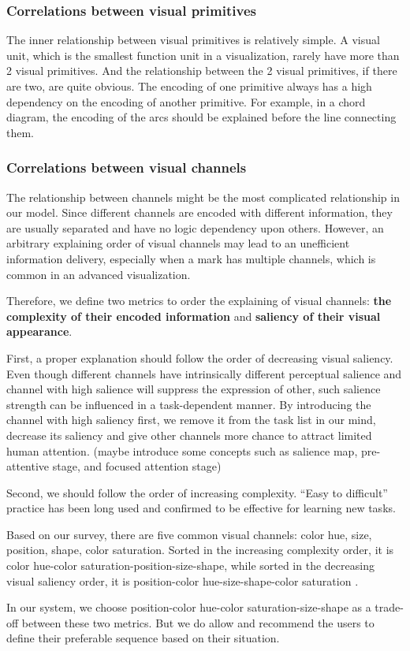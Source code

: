 \documentclass[review,journal]{vgtc}         %
\begin{document}
\subsubsection{Correlations between visual primitives}
The inner relationship between visual primitives is relatively simple.
A visual unit, which is the smallest function unit in a visualization, rarely have more than 2 visual primitives. And the relationship between the 2 visual primitives, if there are two, are quite obvious. The encoding of one primitive always has a high dependency on the encoding of another primitive. For example, in a chord diagram, the encoding of the arcs should be explained before the line connecting them. 

\subsubsection{Correlations between visual channels}
The relationship between channels might be the most complicated relationship in our model. Since different channels are encoded with different information, they are usually separated and have no logic dependency upon others. However, an arbitrary explaining order of visual channels may lead to an unefficient information delivery, especially when a mark has multiple channels, which is common in an advanced visualization. 

Therefore, we define two metrics to order the explaining of visual channels: \textbf{the complexity of their encoded information} and \textbf{saliency of their visual appearance}.

First, a proper explanation should follow the order of decreasing visual saliency.\cite{cleveland_graphical_1984} Even though different channels have intrinsically different perceptual salience and channel with high salience will suppress the expression of other, such salience strength can be influenced in a task-dependent manner. \cite{nothdurft_salience_2000} By introducing the channel with high saliency first, we remove it from the task list in our mind, decrease its saliency and give other channels more chance to attract limited human attention. (maybe introduce some concepts such as salience map, pre-attentive stage, and focused attention stage) \par
 Second, we should follow the order of increasing complexity. “Easy to difficult” practice has been long used and confirmed to be effective for learning new tasks\cite{bliss_effects_1992}.\par
 Based on our survey, there are five common visual channels: color hue, size, position, shape, color saturation. Sorted in the increasing complexity order, it is color hue-color saturation-position-size-shape, while sorted in the decreasing visual saliency order, it is position-color hue-size-shape-color saturation \cite{munzner_visualization_2014,cleveland_graphical_1984}.  \par
In our system, we choose position-color hue-color saturation-size-shape as a trade-off between these two metrics. But we do allow and recommend the users to define their preferable sequence based on their situation. \par
\end{document}
